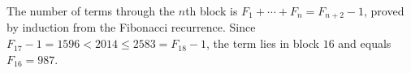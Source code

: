 The number of terms through the $n$th block is $F_1+\cdots+F_n=F_{n+2}-1$, proved by induction from the Fibonacci recurrence. Since $F_{17}-1=1596<2014\le2583=F_{18}-1$, the term lies in block $16$ and equals $F_{16}=\boxed{987}$.
